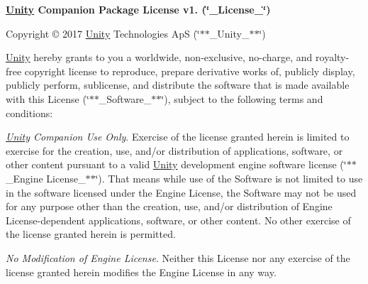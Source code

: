 {\bfseries{\mbox{\hyperlink{namespace_unity}{Unity}} Companion Package License v1. (\char`\"{}\+\_\+\+License\+\_\+\char`\"{})}}

Copyright © 2017 \mbox{\hyperlink{namespace_unity}{Unity}} Technologies ApS (\char`\"{}$\ast$$\ast$\+\_\+\+Unity\+\_\+$\ast$$\ast$\char`\"{})

\mbox{\hyperlink{namespace_unity}{Unity}} hereby grants to you a worldwide, non-\/exclusive, no-\/charge, and royalty-\/free copyright license to reproduce, prepare derivative works of, publicly display, publicly perform, sublicense, and distribute the software that is made available with this License (\char`\"{}$\ast$$\ast$\+\_\+\+Software\+\_\+$\ast$$\ast$\char`\"{}), subject to the following terms and conditions\+:


\begin{DoxyEnumerate}
\item {\itshape \mbox{\hyperlink{namespace_unity}{Unity}} Companion Use Only}. Exercise of the license granted herein is limited to exercise for the creation, use, and/or distribution of applications, software, or other content pursuant to a valid \mbox{\hyperlink{namespace_unity}{Unity}} development engine software license (\char`\"{}$\ast$$\ast$\+\_\+\+Engine License\+\_\+$\ast$$\ast$\char`\"{}). That means while use of the Software is not limited to use in the software licensed under the Engine License, the Software may not be used for any purpose other than the creation, use, and/or distribution of Engine License-\/dependent applications, software, or other content. No other exercise of the license granted herein is permitted.
\end{DoxyEnumerate}
\begin{DoxyEnumerate}
\item {\itshape No Modification of Engine License}. Neither this License nor any exercise of the license granted herein modifies the Engine License in any way.
\end{DoxyEnumerate}
